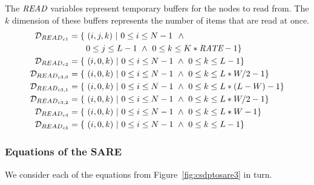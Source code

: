 
The $\mbox{\it READ}$ variables represent temporary buffers for the nodes to
read from.  The $k$ dimension of these buffers represents the number
of items that are read at once.
{\scriptsize
\begin{align*}
{\cal D}_{{READ}_{c1}} &= \{~(i,j,k)~|~0 \le i \le N-1\ ~\wedge~ \\ &~~~~~~0 \le j \le L - 1 ~\wedge~ 0 \le k \le K * \mt{RATE} - 1 \} \\
{\cal D}_{{READ}_{c2}} &= \{~(i,0,k)~|~0 \le i \le N-1 ~\wedge~  0 \le k \le L - 1\} \\
{\cal D}_{{READ}_{c3, 0}} &= \{~(i,0,k)~|~0 \le i \le N-1 ~\wedge~ 0 \le k \le L * W / 2 - 1 \} \\
{\cal D}_{{READ}_{c3, 1}} &= \{~(i,0,k)~|~0 \le i \le N-1 ~\wedge~ 0 \le k \le L * (L - W) - 1 \} \\
{\cal D}_{{READ}_{c3, 2}} &= \{~(i,0,k)~|~0 \le i \le N-1 ~\wedge~ 0 \le k \le L * W / 2 - 1 \} \\
{\cal D}_{{READ}_{c4}} &= \{~(i,0,k)~|~0 \le i \le N-1 ~\wedge~ 0 \le k \le L * W - 1 \} \\
{\cal D}_{{READ}_{c5}} &= \{~(i,0,k)~|~0 \le i \le N-1 ~\wedge~ 0 \le k \le L - 1 \} \\
\end{align*}}

\subsubsection{Equations of the SARE}

We consider each of the equations from Figure~\ref{fig:csdptosare3} in turn.


